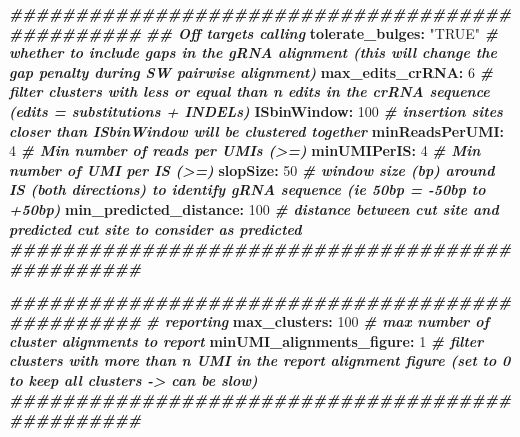 \documentclass[
]{article}
\newenvironment{Shaded}{\begin{snugshade}}{\end{snugshade}}
\newcommand{\AttributeTok}[1]{\textcolor[rgb]{0.74,0.68,0.62}{#1}}
\newcommand{\CommentTok}[1]{\textcolor[rgb]{0.00,0.40,1.00}{\textbf{\textit{#1}}}}
\newcommand{\DecValTok}[1]{\textcolor[rgb]{0.27,0.67,0.26}{#1}}
\newcommand{\FunctionTok}[1]{\textcolor[rgb]{1.00,0.58,0.35}{\textbf{#1}}}
\newcommand{\KeywordTok}[1]{\textcolor[rgb]{0.26,0.66,0.93}{\textbf{#1}}}
\newcommand{\StringTok}[1]{\textcolor[rgb]{0.02,0.61,0.04}{#1}}
\begin{document}
\begin{Shaded}
\begin{Highlighting}[]
\CommentTok{\#\#\#\#\#\#\#\#\#\#\#\#\#\#\#\#\#\#\#\#\#\#\#\#\#\#\#\#\#\#\#\#\#\#\#\#\#\#\#\#\#\#\#\#\#\#\#\#}
\CommentTok{\#\# Off targets calling}
\FunctionTok{tolerate\_bulges}\KeywordTok{:}\AttributeTok{ }\StringTok{"TRUE"}\CommentTok{           \# whether to include gaps in the gRNA alignment (this will change the gap penalty during SW pairwise alignment)}
\FunctionTok{max\_edits\_crRNA}\KeywordTok{:}\AttributeTok{ }\DecValTok{6}\CommentTok{                \# filter clusters with less or equal than n edits in the crRNA sequence (edits = substitutions + INDELs)}
\FunctionTok{ISbinWindow}\KeywordTok{:}\AttributeTok{ }\DecValTok{100}\CommentTok{                  \# insertion sites closer than \textquotesingle{}ISbinWindow\textquotesingle{} will be clustered together}
\FunctionTok{minReadsPerUMI}\KeywordTok{:}\AttributeTok{ }\DecValTok{4}\CommentTok{                 \# Min number of reads per UMIs (\textgreater{}=)}
\FunctionTok{minUMIPerIS}\KeywordTok{:}\AttributeTok{ }\DecValTok{4}\CommentTok{                      \# Min number of UMI per IS (\textgreater{}=)}
\FunctionTok{slopSize}\KeywordTok{:}\AttributeTok{ }\DecValTok{50}\CommentTok{                      \# window size (bp) around IS (both directions) to identify gRNA sequence (ie 50bp = {-}50bp to +50bp)}
\FunctionTok{min\_predicted\_distance}\KeywordTok{:}\AttributeTok{ }\DecValTok{100}\CommentTok{       \# distance between cut site and predicted cut site to consider as predicted}
\CommentTok{\#\#\#\#\#\#\#\#\#\#\#\#\#\#\#\#\#\#\#\#\#\#\#\#\#\#\#\#\#\#\#\#\#\#\#\#\#\#\#\#\#\#\#\#\#\#\#\#}

\CommentTok{\#\#\#\#\#\#\#\#\#\#\#\#\#\#\#\#\#\#\#\#\#\#\#\#\#\#\#\#\#\#\#\#\#\#\#\#\#\#\#\#\#\#\#\#\#\#\#\#}
\CommentTok{\# reporting}
\FunctionTok{max\_clusters}\KeywordTok{:}\AttributeTok{ }\DecValTok{100}\CommentTok{                 \# max number of cluster alignments to report}
\FunctionTok{minUMI\_alignments\_figure}\KeywordTok{:}\AttributeTok{ }\DecValTok{1}\CommentTok{       \# filter clusters with more than n UMI in the report alignment figure (set to 0 to keep all clusters {-}\textgreater{} can be slow)}
\CommentTok{\#\#\#\#\#\#\#\#\#\#\#\#\#\#\#\#\#\#\#\#\#\#\#\#\#\#\#\#\#\#\#\#\#\#\#\#\#\#\#\#\#\#\#\#\#\#\#\#}


\end{Highlighting}
\end{Shaded}
\end{document}
